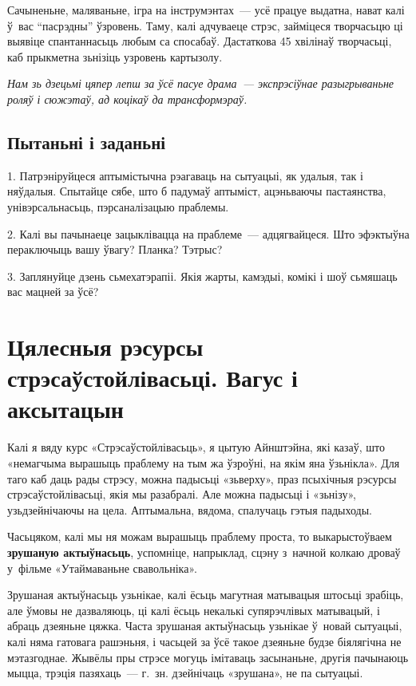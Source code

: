 Сачыненьне, маляваньне, ігра на інструмэнтах~--- усё працуе выдатна, нават калі ў~вас ``пасрэдны'' ўзровень. Таму, калі адчуваеце стрэс, займіцеся творчасьцю ці выявіце спантаннасьць любым са спосабаў. Дастаткова 45 хвілінаў творчасьці, каб прыкметна зьнізіць узровень картызолу. 

\emph{Нам зь дзецьмі цяпер лепш за ўсё пасуе драма~--- экспрэсіўнае разыгрываньне роляў і сюжэтаў, ад коцікаў да трансформэраў.}

\subsection*{Пытаньні і заданьні}

1. Патрэніруйцеся аптымістычна рэагаваць на сытуацыі, як удалыя, так і няўдалыя. Спытайце сябе, што б падумаў аптыміст, ацэньваючы пастаянства, унівэрсальнасьць, пэрсаналізацыю праблемы.

2. Калі вы пачынаеце зацыклівацца на праблеме~--- адцягвайцеся. Што эфэктыўна пераключыць вашу ўвагу? Планка? Тэтрыс?

3. Заплянуйце дзень сьмехатэрапіі. Якія жарты, камэдыі, комікі і шоў сьмяшаць вас мацней за ўсё?


\section{Цялесныя рэсурсы стрэсаўстойлівасьці. Вагус і аксытацын}

Калі я вяду курс «Стрэсаўстойлівасьць», я цытую Айнштэйна, які казаў, што «немагчыма вырашыць праблему на тым жа ўзроўні, на якім яна ўзьнікла». Для таго каб даць рады стрэсу, можна падысьці «зьверху», праз псыхічныя рэсурсы стрэсаўстойлівасьці, якія мы разабралі. Але можна падысьці і «зьнізу», узьдзейнічаючы на цела. Аптымальна, вядома, спалучаць гэтыя падыходы.

Часьцяком, калі мы ня можам вырашыць праблему проста, то выкарыстоўваем \textbf{зрушаную актыўнасьць}, успомніце, напрыклад, сцэну з~начной колкаю дроваў у~фільме «Утаймаваньне свавольніка».

Зрушаная актыўнасьць узьнікае, калі ёсьць магутная матывацыя штосьці зрабіць, але ўмовы не дазваляюць, ці калі ёсьць некалькі супярэчлівых матывацый, і абраць дзеяньне цяжка. Часта зрушаная актыўнасьць узьнікае ў~новай сытуацыі, калі няма гатовага рашэньня, і часьцей за ўсё такое дзеяньне будзе біялягічна не мэтазгоднае. Жывёлы пры стрэсе могуць імітаваць засынаньне, другія пачынаюць мыцца, трэція пазяхаць~--- г.~зн. дзейнічаць «зрушана», не па сытуацыі.


